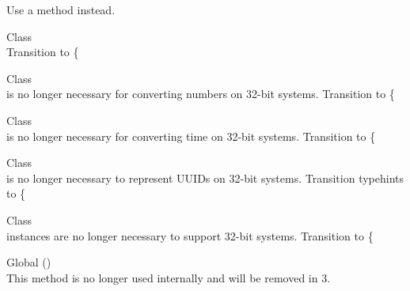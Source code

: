 \begin{DoxyRefList}
\label{deprecated__deprecated000060}%
%
Use a method instead.  
\item[Class \doxylink{class_ramsey_1_1_uuid_1_1_builder_1_1_default_uuid_builder}{Default\+Uuid\+Builder} ]\hfill \\
\label{deprecated__deprecated000341}%
%
Transition to \{ 
\item[Class \doxylink{class_ramsey_1_1_uuid_1_1_converter_1_1_number_1_1_degraded_number_converter}{Degraded\+Number\+Converter} ]\hfill \\
\label{deprecated__deprecated000344}%
%
 is no longer necessary for converting numbers on 32-\/bit systems. Transition to \{ 
\item[Class \doxylink{class_ramsey_1_1_uuid_1_1_converter_1_1_time_1_1_degraded_time_converter}{Degraded\+Time\+Converter} ]\hfill \\
\label{deprecated__deprecated000346}%
%
 is no longer necessary for converting time on 32-\/bit systems. Transition to \{ 
\item[Class \doxylink{class_ramsey_1_1_uuid_1_1_degraded_uuid}{Degraded\+Uuid} ]\hfill \\
\label{deprecated__deprecated000347}%
%
 is no longer necessary to represent UUIDs on 32-\/bit systems. Transition typehints to \{ 
\item[Class \doxylink{class_ramsey_1_1_uuid_1_1_builder_1_1_degraded_uuid_builder}{Degraded\+Uuid\+Builder} ]\hfill \\
\label{deprecated__deprecated000342}%
%
 instances are no longer necessary to support 32-\/bit systems. Transition to \{ 
\item[Global \doxylink{interface_league_1_1_common_mark_1_1_delimiter_1_1_delimiter_interface_aa56a17bc66c1081fad1cca3a488224c3}{Delimiter\+Interface\+::is\+Active} ()]\hfill \\
\label{deprecated__deprecated000124}%
%
This method is no longer used internally and will be removed in 3.  

\end{DoxyRefList}
